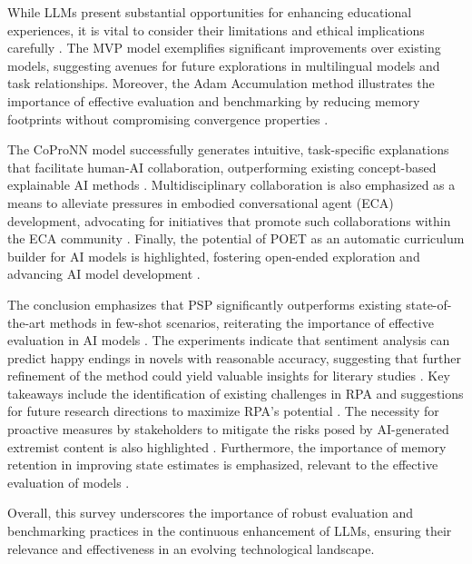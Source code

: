 While LLMs present substantial opportunities for enhancing educational experiences, it is vital to consider their limitations and ethical implications carefully \cite{kasneci2023chatgpt}. The MVP model exemplifies significant improvements over existing models, suggesting avenues for future explorations in multilingual models and task relationships. Moreover, the Adam Accumulation method illustrates the importance of effective evaluation and benchmarking by reducing memory footprints without compromising convergence properties \cite{zhang2023adamaccumulationreducememory}.



The CoProNN model successfully generates intuitive, task-specific explanations that facilitate human-AI collaboration, outperforming existing concept-based explainable AI methods \cite{chiaburu2024copronnconceptbasedprototypicalnearest}. Multidisciplinary collaboration is also emphasized as a means to alleviate pressures in embodied conversational agent (ECA) development, advocating for initiatives that promote such collaborations within the ECA community \cite{korre2023takesvillagemultidisciplinaritycollaboration}. Finally, the potential of POET as an automatic curriculum builder for AI models is highlighted, fostering open-ended exploration and advancing AI model development \cite{wang2019pairedopenendedtrailblazerpoet}.



The conclusion emphasizes that PSP significantly outperforms existing state-of-the-art methods in few-shot scenarios, reiterating the importance of effective evaluation in AI models \cite{ge2024psppretrainingstructureprompt}. The experiments indicate that sentiment analysis can predict happy endings in novels with reasonable accuracy, suggesting that further refinement of the method could yield valuable insights for literary studies \cite{jannidis2016analyzingfeaturesdetectionhappy}. Key takeaways include the identification of existing challenges in RPA and suggestions for future research directions to maximize RPA's potential \cite{pandy2024advancementsroboticsprocessautomation}. The necessity for proactive measures by stakeholders to mitigate the risks posed by AI-generated extremist content is also highlighted \cite{mcguffie2020radicalizationrisksgpt3advanced}. Furthermore, the importance of memory retention in improving state estimates is emphasized, relevant to the effective evaluation of models \cite{lathouwers2017memorypaysdiscordhidden}.



Overall, this survey underscores the importance of robust evaluation and benchmarking practices in the continuous enhancement of LLMs, ensuring their relevance and effectiveness in an evolving technological landscape.